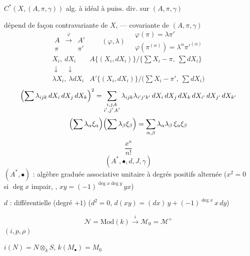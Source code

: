 \documentclass[11pt,a4paper]{article}
\begin{document}
$C^*(X, (A, \pi, \gamma))$ \quad alg.  à idéal à puiss. div. sur $(A, \pi, \gamma)$

dépend de façon contravariante de $X$, \quad --- covariante de $(A, \pi, \gamma)$
\[
  \begin{array}{ccc}
    A & \xrightarrow{\ \varphi\ } & A' \\
    \pi & & \pi'
  \end{array}
  \qquad
  (\varphi, \lambda) \quad
  \begin{array}{l}
    \varphi(\pi) = \lambda \pi' \\
    \varphi(\pi^{(\alpha)}) = \lambda^{\alpha} \pi'^{(\alpha)}
  \end{array}
\]
\[
  \begin{array}{rl}
    X_i,\ dX_i & A\{(X_i, dX_i)\}\big/\bigl\{\textstyle\sum X_i - \pi,\ \sum dX_i\bigr\} \\
    \downarrow \quad \downarrow & \\
    \lambda X_i,\ \lambda dX_i & A'\{(X_i, dX_i)\}\big/\bigl(\textstyle\sum X_i - \pi',\ \sum dX_i\bigr)
  \end{array}
\]
\[
  \Bigl(\sum \lambda_{ijk}\, dX_i\, dX_j\, dX_k\Bigr)^2
  = \sum_{\substack{i,j,k \\ i',j',k'}} \lambda_{ijk} \lambda_{i'j'k'}\, dX_i\, dX_j\, dX_k\, dX_{i'}\, dX_{j'}\, dX_{k'}
\]
\[
  \Bigl(\sum \lambda_{\alpha} \xi_{\alpha}\Bigr)\Bigl(\sum \lambda_{\beta} \xi_{\beta}\Bigr) = \sum_{\alpha,\beta} \lambda_{\alpha} \lambda_{\beta}\, \xi_{\alpha} \xi_{\beta}
\]
\[
  \frac{x^n}{n!}
\]
\[
  (A^*, \bullet, d, J, \gamma)
\]
$(A^*, \bullet)$ : algèbre graduée associative unitaire à degrés positifs alternée ($x^2 = 0$ si $\deg x$ impair, , $xy = (-1)^{\deg x \deg y}\, yx$)

$d$ : différentielle (degré $+1$) ($d^2 = 0$, $d(xy) = (dx)\,y + (-1)^{\deg x}\, x\, dy$)

\[
  \mathcal{N} = \mathrm{Mod}(k) \overset{i}{\longrightarrow} \mathcal{M}_0 = \mathcal{M}^+
\]
 $(i, p, \rho)$

$i(N) = N \otimes_k S$, \quad $k(M_\bullet) = M_0$
\end{document}
